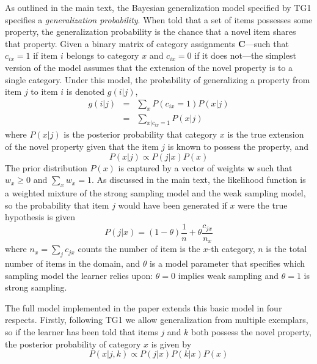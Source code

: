 \documentclass[doc,floatsintext]{apa6}
\begin{document}
As outlined in the main text, the Bayesian generalization model specified by TG1 specifies a {\it generalization probability}. When told that a set of items possesses some property, the generalization probability is the chance that a novel item shares that property. Given a binary matrix of category assignments $\mathbf{C}$---such that $c_{ix} = 1$ if item $i$ belongs to category $x$ and $c_{ix}=0$ if it does not---the simplest version of the model assumes that the extension of the novel property is to a single category. Under this model, the probability of generalizing a property from item $j$ to item $i$ is denoted $g(i|j)$,
\begin{equation}
\begin{array}{rcl}
g(i|j) &=& \sum_x P(c_{ix}=1) P(x | j)  \\
&=& \sum_{x | c_{ix}=1} P(x | j)
\end{array}
\end{equation}
where $P(x|j)$ is the posterior probability that category $x$ is the true extension of the novel property given that the item $j$ is known to possess the property, and
\begin{equation}
P(x|j) \propto P(j|x) P(x)
\end{equation}
The prior distribution $P(x)$ is captured by a vector of weights $\mathbf{w}$ such that $w_x \geq 0$ and $\sum_x w_x = 1$. As discussed in the main text, the likelihood function is a weighted mixture of the strong sampling model and the weak sampling model, so the probability that item $j$ would have been generated if $x$ were the true hypothesis is given
\begin{equation}
P(j|x) = (1-\theta) \frac{1}{n} + \theta \frac{c_{jx}}{n_x}
\end{equation}
where $n_x = \sum_j c_{jx}$ counts the number of item is the $x$-th category, $n$ is the total number of items in the domain, and $\theta$ is a model parameter that specifies which sampling model the learner relies upon: $\theta=0$ implies weak sampling and $\theta=1$ is strong sampling.

The full model implemented in the paper extends this basic model in four respects. Firstly, following TG1 we allow generalization from multiple exemplars, so if the learner has been told that items $j$ and $k$ both possess the novel property, the posterior probability of category $x$ is given by
\begin{equation}
P(x|j,k) \propto P(j|x) P(k|x) P(x)
\end{equation}
\end{document}
